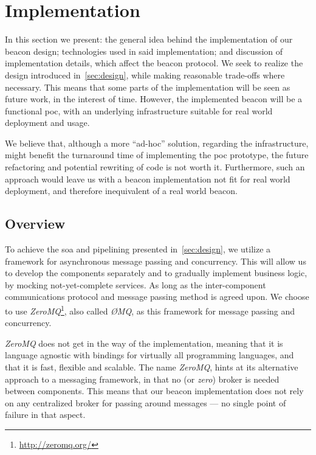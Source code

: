 \section{Implementation}
\label{sec:implementation}

In this section we present: the general idea behind the implementation of our beacon design; technologies used in said implementation; and discussion of implementation details, which affect the beacon protocol.
We seek to realize the design introduced in~\cref{sec:design}, while making reasonable trade-offs where necessary.
This means that some parts of the implementation will be seen as future work, in the interest of time.
However, the implemented beacon will be a functional \gls{poc}, with an underlying infrastructure suitable for real world deployment and usage.

We believe that, although a more \enquote{ad-hoc} solution, regarding the infrastructure, might benefit the turnaround time of implementing the \gls{poc} prototype, the future refactoring and potential rewriting of code is not worth it.
Furthermore, such an approach would leave us with a beacon implementation not fit for real world deployment, and therefore inequivalent of a real world beacon.

\subsection{Overview}%
\label{sub:overview}
To achieve the \acrfull{soa} and pipelining presented in~\cref{sec:design}, we utilize a framework for asynchronous message passing and concurrency.
This will allow us to develop the components separately and to gradually implement business logic, by mocking not-yet-complete services.
As long as the inter-component communications protocol and message passing method is agreed upon.
We choose to use \textit{ZeroMQ}\footnote{\url{http://zeromq.org/}}, also called \textit{ØMQ}, as this framework for message passing and concurrency.

\textit{ZeroMQ} does not get in the way of the implementation, meaning that it is language agnostic with bindings for virtually all programming languages, and that it is fast, flexible and scalable.
The name \textit{ZeroMQ}, hints at its alternative approach to a messaging framework, in that no (or \textit{zero}) broker is needed between components.
This means that our beacon implementation does not rely on any centralized broker for passing around messages --- no single point of failure in that aspect.

